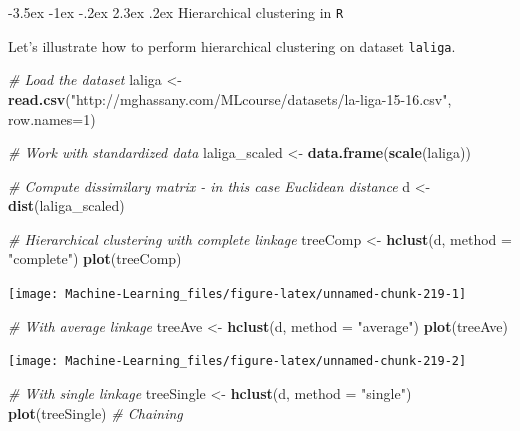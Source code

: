 \documentclass[]{book}
\makeatletter
\newenvironment{Shaded}{\begin{snugshade}}{\end{snugshade}}
\newcommand{\KeywordTok}[1]{\textcolor[rgb]{0.13,0.29,0.53}{\textbf{#1}}}
\newcommand{\DataTypeTok}[1]{\textcolor[rgb]{0.13,0.29,0.53}{#1}}
\newcommand{\DecValTok}[1]{\textcolor[rgb]{0.00,0.00,0.81}{#1}}
\newcommand{\StringTok}[1]{\textcolor[rgb]{0.31,0.60,0.02}{#1}}
\newcommand{\CommentTok}[1]{\textcolor[rgb]{0.56,0.35,0.01}{\textit{#1}}}
\newcommand{\NormalTok}[1]{#1}
\renewcommand\section{\@startsection {section}{1}{\z@}%
                                   {-3.5ex \@plus -1ex \@minus -.2ex}%
                                   {2.3ex \@plus.2ex}%
                                   {\normalfont\Large\bfseries\color{ForestGreen}}}
\theoremstyle{definition}
\theoremstyle{definition}
\theoremstyle{definition}
\theoremstyle{remark}
\makeatother
\begin{document}
\section{\texorpdfstring{Hierarchical clustering in
\texttt{R}}{Hierarchical clustering in R}}\label{hierarchical-clustering-in-r}

Let's illustrate how to perform hierarchical clustering on dataset
\texttt{laliga}.

\begin{Shaded}
\begin{Highlighting}[]
\CommentTok{# Load the dataset}
\NormalTok{laliga <-}\StringTok{ }\KeywordTok{read.csv}\NormalTok{(}\StringTok{"http://mghassany.com/MLcourse/datasets/la-liga-15-16.csv"}\NormalTok{, }\DataTypeTok{row.names=}\DecValTok{1}\NormalTok{)}

\CommentTok{# Work with standardized data}
\NormalTok{laliga_scaled <-}\StringTok{ }\KeywordTok{data.frame}\NormalTok{(}\KeywordTok{scale}\NormalTok{(laliga))}

\CommentTok{# Compute dissimilary matrix - in this case Euclidean distance}
\NormalTok{d <-}\StringTok{ }\KeywordTok{dist}\NormalTok{(laliga_scaled)}

\CommentTok{# Hierarchical clustering with complete linkage}
\NormalTok{treeComp <-}\StringTok{ }\KeywordTok{hclust}\NormalTok{(d, }\DataTypeTok{method =} \StringTok{"complete"}\NormalTok{)}
\KeywordTok{plot}\NormalTok{(treeComp)}
\end{Highlighting}
\end{Shaded}

\begin{center}\texttt{[image: Machine-Learning\_files/figure-latex/unnamed-chunk-219-1]} \end{center}

\begin{Shaded}
\begin{Highlighting}[]

\CommentTok{# With average linkage}
\NormalTok{treeAve <-}\StringTok{ }\KeywordTok{hclust}\NormalTok{(d, }\DataTypeTok{method =} \StringTok{"average"}\NormalTok{)}
\KeywordTok{plot}\NormalTok{(treeAve)}
\end{Highlighting}
\end{Shaded}

\begin{center}\texttt{[image: Machine-Learning\_files/figure-latex/unnamed-chunk-219-2]} \end{center}

\begin{Shaded}
\begin{Highlighting}[]

\CommentTok{# With single linkage}
\NormalTok{treeSingle <-}\StringTok{ }\KeywordTok{hclust}\NormalTok{(d, }\DataTypeTok{method =} \StringTok{"single"}\NormalTok{)}
\KeywordTok{plot}\NormalTok{(treeSingle) }\CommentTok{# Chaining}
\end{Highlighting}
\end{Shaded}
\end{document}
